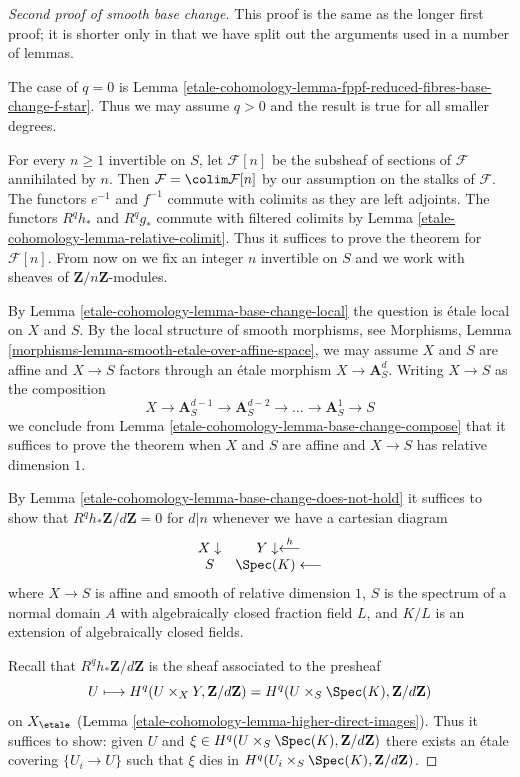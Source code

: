 \begin{proof}[Second proof of smooth base change]
This proof is the same as the longer first proof;
it is shorter only in that we have split out the
arguments used in a number of lemmas.

\medskip\noindent
The case of $q = 0$ is
Lemma \ref{etale-cohomology-lemma-fppf-reduced-fibres-base-change-f-star}.
Thus we may assume $q > 0$ and the result is true
for all smaller degrees.

\medskip\noindent
For every $n \geq 1$ invertible on $S$, let $\mathcal{F}[n]$
be the subsheaf of sections of $\mathcal{F}$ annihilated by $n$. Then
$\mathcal{F} = \colim \mathcal{F}[n]$ by our assumption on
the stalks of $\mathcal{F}$. The functors $e^{-1}$ and $f^{-1}$
commute with colimits as they are left adjoints. The functors
$R^qh_*$ and $R^qg_*$ commute with filtered colimits by
Lemma \ref{etale-cohomology-lemma-relative-colimit}.
Thus it suffices to prove the theorem for $\mathcal{F}[n]$.
From now on we fix an integer $n$ invertible on $S$ and we work with
sheaves of $\mathbf{Z}/n\mathbf{Z}$-modules.

\medskip\noindent
By Lemma \ref{etale-cohomology-lemma-base-change-local} the question is \'etale local
on $X$ and $S$. By the local structure of smooth morphisms, see
Morphisms, Lemma \ref{morphisms-lemma-smooth-etale-over-affine-space},
we may assume $X$ and $S$ are affine and $X \to S$
factors through an \'etale morphism $X \to \mathbf{A}^d_S$.
Writing $X \to S$ as the composition
$$
X \to \mathbf{A}^{d - 1}_S \to \mathbf{A}^{d - 2}_S \to \ldots \to
\mathbf{A}^1_S \to S
$$
we conclude from Lemma \ref{etale-cohomology-lemma-base-change-compose}
that it suffices to prove the theorem when $X$ and $S$
are affine and $X \to S$ has relative dimension $1$.

\medskip\noindent
By Lemma \ref{etale-cohomology-lemma-base-change-does-not-hold} it suffices to show that
$R^qh_*\mathbf{Z}/d\mathbf{Z} = 0$ for $d | n$ whenever we have a
cartesian diagram
$$
\begin{array}{cc}X \downarrow & Y \downarrow\overset{h}{\longleftarrow} \\ S & \Spec(K) \longleftarrow\end{array}
$$
where $X \to S$ is affine and smooth of relative dimension $1$,
$S$ is the spectrum of a normal
domain $A$ with algebraically closed fraction field $L$,
and $K/L$ is an extension of algebraically closed fields.

\medskip\noindent
Recall that $R^qh_*\mathbf{Z}/d\mathbf{Z}$ is the sheaf associated
to the presheaf
$$
U \longmapsto
H^q(U \times_X Y, \mathbf{Z}/d\mathbf{Z}) =
H^q(U \times_S \Spec(K), \mathbf{Z}/d\mathbf{Z})
$$
on $X_\etale$ (Lemma \ref{etale-cohomology-lemma-higher-direct-images}).
Thus it suffices to show: given $U$ and
$\xi \in H^q(U \times_S \Spec(K), \mathbf{Z}/d\mathbf{Z})$
there exists an \'etale covering $\{U_i \to U\}$
such that $\xi$ dies in $H^q(U_i \times_S \Spec(K), \mathbf{Z}/d\mathbf{Z})$.


\end{proof}
